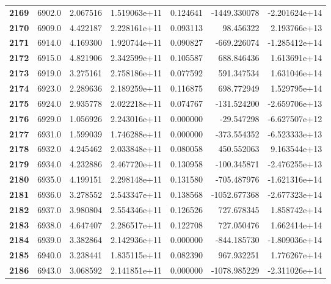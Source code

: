 \documentclass{report}[12pt]
\begin{document}
\begin{center}
\begin{tabular}{lrrrrrr}
\textbf{2169} &         6902.0 &   2.067516 &  1.519063e+11 &    0.124641 & -1449.330078 & -2.201624e+14 \\
\textbf{2170} &         6909.0 &   4.422187 &  2.228161e+11 &    0.093113 &    98.456322 &  2.193766e+13 \\
\textbf{2171} &         6914.0 &   4.169300 &  1.920744e+11 &    0.090827 &  -669.226074 & -1.285412e+14 \\
\textbf{2172} &         6915.0 &   4.821906 &  2.342599e+11 &    0.105587 &   688.846436 &  1.613691e+14 \\
\textbf{2173} &         6919.0 &   3.275161 &  2.758186e+11 &    0.077592 &   591.347534 &  1.631046e+14 \\
\textbf{2174} &         6923.0 &   2.289636 &  2.189259e+11 &    0.116875 &   698.772949 &  1.529795e+14 \\
\textbf{2175} &         6924.0 &   2.935778 &  2.022218e+11 &    0.074767 &  -131.524200 & -2.659706e+13 \\
\textbf{2176} &         6929.0 &   1.056926 &  2.243016e+11 &    0.000000 &   -29.547298 & -6.627507e+12 \\
\textbf{2177} &         6931.0 &   1.599039 &  1.746288e+11 &    0.000000 &  -373.554352 & -6.523333e+13 \\
\textbf{2178} &         6932.0 &   4.245462 &  2.033848e+11 &    0.080058 &   450.552063 &  9.163544e+13 \\
\textbf{2179} &         6934.0 &   4.232886 &  2.467720e+11 &    0.130958 &  -100.345871 & -2.476255e+13 \\
\textbf{2180} &         6935.0 &   4.199151 &  2.298148e+11 &    0.131580 &  -705.487976 & -1.621316e+14 \\
\textbf{2181} &         6936.0 &   3.278552 &  2.543347e+11 &    0.138568 & -1052.677368 & -2.677323e+14 \\
\textbf{2182} &         6937.0 &   3.980804 &  2.554346e+11 &    0.126526 &   727.678345 &  1.858742e+14 \\
\textbf{2183} &         6938.0 &   4.647407 &  2.286517e+11 &    0.122708 &   727.050476 &  1.662414e+14 \\
\textbf{2184} &         6939.0 &   3.382864 &  2.142936e+11 &    0.000000 &  -844.185730 & -1.809036e+14 \\
\textbf{2185} &         6940.0 &   3.238441 &  1.835115e+11 &    0.082390 &   967.932251 &  1.776267e+14 \\
\textbf{2186} &         6943.0 &   3.068592 &  2.141851e+11 &    0.000000 & -1078.985229 & -2.311026e+14 \\

\end{tabular}
\end{center}
\end{document}
